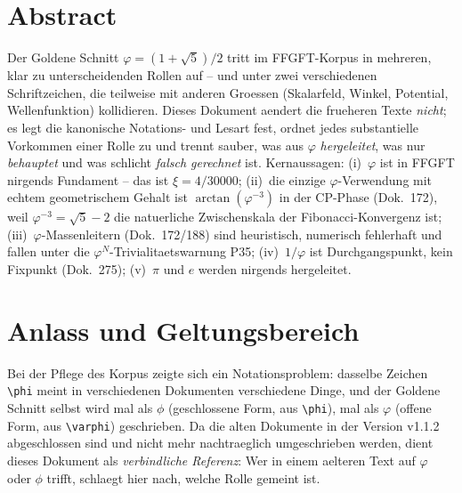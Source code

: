 
\section*{Abstract}
Der Goldene Schnitt $\varphi = (1+\sqrt5)/2$ tritt im FFGFT-Korpus in
mehreren, klar zu unterscheidenden Rollen auf -- und unter zwei verschiedenen
Schriftzeichen, die teilweise mit anderen Groessen (Skalarfeld, Winkel,
Potential, Wellenfunktion) kollidieren. Dieses Dokument aendert die frueheren
Texte \emph{nicht}; es legt die kanonische Notations- und Lesart fest, ordnet
jedes substantielle Vorkommen einer Rolle zu und trennt sauber, was aus
$\varphi$ \emph{hergeleitet}, was nur \emph{behauptet} und was schlicht
\emph{falsch gerechnet} ist. Kernaussagen: (i)~$\varphi$ ist in FFGFT nirgends
Fundament -- das ist $\xi=4/30000$; (ii)~die einzige $\varphi$-Verwendung mit
echtem geometrischem Gehalt ist $\arctan(\varphi^{-3})$ in der CP-Phase
(Dok.~172), weil $\varphi^{-3}=\sqrt5-2$ die natuerliche Zwischenskala der
Fibonacci-Konvergenz ist; (iii)~$\varphi$-Massenleitern (Dok.~172/188) sind
heuristisch, numerisch fehlerhaft und fallen unter die
$\varphi^N$-Trivialitaetswarnung P35; (iv)~$1/\varphi$ ist Durchgangspunkt,
kein Fixpunkt (Dok.~275); (v)~$\pi$ und $e$ werden nirgends hergeleitet.

\section{Anlass und Geltungsbereich}

Bei der Pflege des Korpus zeigte sich ein Notationsproblem: dasselbe
Zeichen \verb|\phi| meint in verschiedenen Dokumenten verschiedene Dinge,
und der Goldene Schnitt selbst wird mal als $\phi$ (geschlossene Form, aus
\verb|\phi|), mal als $\varphi$ (offene Form, aus \verb|\varphi|)
geschrieben. Da die alten Dokumente in der Version v1.1.2 abgeschlossen sind
und nicht mehr nachtraeglich umgeschrieben werden, dient dieses Dokument als
\emph{verbindliche Referenz}: Wer in einem aelteren Text auf $\varphi$ oder
$\phi$ trifft, schlaegt hier nach, welche Rolle gemeint ist.

